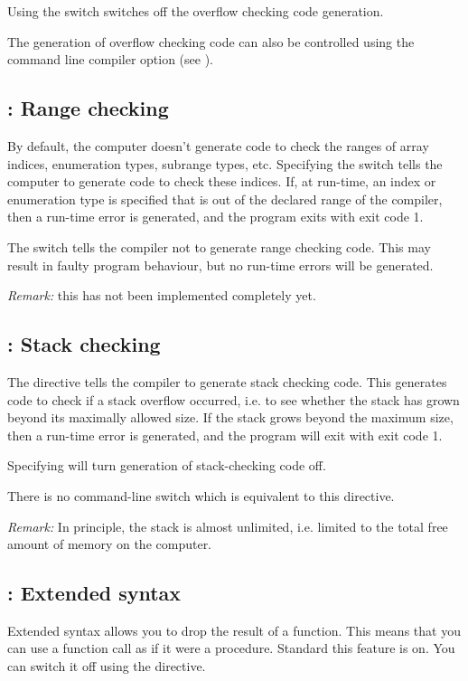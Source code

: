 \documentclass{report}
\begin{document}
Using the  switch switches off the overflow checking code
generation.

The generation of overflow checking code can also be controlled 
using the  command line compiler option (see \userref).

\subsection{ : Range checking}
By default, the computer doesn't generate code to check the ranges of array
indices, enumeration types, subrange types, etc. Specifying the
 switch tells the computer to generate code to check these
indices. If, at run-time, an index or enumeration type is specified that is
out of the declared range of the compiler, then a run-time error is
generated, and the program exits with exit code 1.

The  switch tells the compiler not to generate range checking
code. This may result in faulty program behaviour, but no run-time errors
will be generated.

{\em Remark: } this has not been implemented completely yet.

\subsection{ : Stack checking}
The  directive tells the compiler to generate stack checking
code. This generates code to check if a stack overflow occurred, i.e. to see
whether the stack has grown beyond its maximally allowed size. If the stack
grows beyond the maximum size, then a run-time error is generated, and the
program will exit with exit code 1.

Specifying  will turn generation of stack-checking code off.

There is no command-line switch which is equivalent to this directive.

{\em Remark: } In principle, the stack is almost unlimited, 
i.e. limited to the total free amount of memory on the computer.


\subsection{ : Extended syntax}
Extended syntax allows you to drop the result of a function. This means that
you can use a function call as if it were a procedure. Standard this feature
is on. You can switch it off using the  directive.
\end{document}

